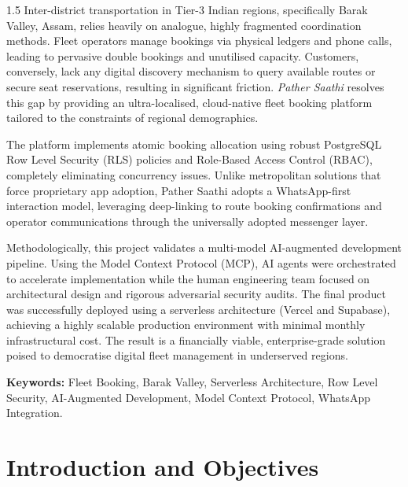\begin{spacing}{1.5}
Inter-district transportation in Tier-3 Indian regions, specifically Barak Valley, Assam, relies heavily on analogue, highly fragmented coordination methods. Fleet operators manage bookings via physical ledgers and phone calls, leading to pervasive double bookings and unutilised capacity. Customers, conversely, lack any digital discovery mechanism to query available routes or secure seat reservations, resulting in significant friction. \textit{Pather Saathi} resolves this gap by providing an ultra-localised, cloud-native fleet booking platform tailored to the constraints of regional demographics. 

The platform implements atomic booking allocation using robust PostgreSQL Row Level Security (RLS) policies and Role-Based Access Control (RBAC), completely eliminating concurrency issues. Unlike metropolitan solutions that force proprietary app adoption, Pather Saathi adopts a WhatsApp-first interaction model, leveraging deep-linking to route booking confirmations and operator communications through the universally adopted messenger layer.

Methodologically, this project validates a multi-model AI-augmented development pipeline. Using the Model Context Protocol (MCP), AI agents were orchestrated to accelerate implementation while the human engineering team focused on architectural design and rigorous adversarial security audits. The final product was successfully deployed using a serverless architecture (Vercel and Supabase), achieving a highly scalable production environment with minimal monthly infrastructural cost. The result is a financially viable, enterprise-grade solution poised to democratise digital fleet management in underserved regions.

\vspace{1cm}
\textbf{Keywords:} Fleet Booking, Barak Valley, Serverless Architecture, Row Level Security, AI-Augmented Development, Model Context Protocol, WhatsApp Integration.
\end{spacing}

\newpage
{}
\renewcommand{\cftchapfont}{\bfseries\color{darkgray}}
\renewcommand{\cftchappagefont}{\bfseries\color{brandteal}}
\renewcommand{\cftsecfont}{\normalfont\color{darkgray}}
\renewcommand{\cftchapleader}{\cftdotfill{\cftdotsep}}

\tableofcontents
\newpage
\listoffigures
\newpage
\listoftables
\newpage
{}

\chapter{Introduction and Objectives}
